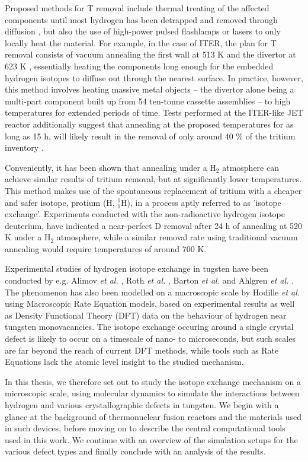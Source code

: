 Proposed methods for T removal include thermal treating of the affected components until most hydrogen has been detrapped and removed through diffusion \cite{heinola2017long}, but also the use of high-power pulsed flashlamps \cite{gibson2005removal} or lasers \cite{skinner2008recent,de2017efficiency} to only locally heat the material. 
For example, in the case of ITER, the plan for T removal consists of vacuum annealing the first wall at 513 K and the divertor at 623 K \cite{pitts2011physics}, essentially heating the components long enough for the embedded hydrogen isotopes to diffuse out through the nearest surface.
In practice, however, this method involves heating massive metal objects -- the divertor alone being a multi-part component built up from 54 ten-tonne cassette assemblies -- to high temperatures for extended periods of time. 
Tests performed at the ITER-like JET reactor additionally suggest that annealing at the proposed temperatures for as long as 15 h, will likely result in the removal of only around 40 \% of the tritium inventory \cite{heinola2017long}. 

Conveniently, it has been shown \cite{alimov2011hydrogen, roth2013hydrogen, barton2014deuterium} that annealing under a H$_2$ atmosphere can achieve similar results of tritium removal, but at significantly lower temperatures. 
This method makes use of the spontaneous replacement of tritium with a cheaper and safer isotope, protium (H, $^1_1$H), in a process aptly referred to as 'isotope exchange'. 
Experiments conducted with the non-radioactive hydrogen isotope deuterium, have indicated a near-perfect D removal after 24 h of annealing at 520 K under a H$_2$ atmosphere, while a similar removal rate using traditional vacuum annealing would require temperatures of around 700 K. \cite{ahlgren2019hydrogen}

Experimental studies of hydrogen isotope exchange in tugsten have been conducted by e.g. Alimov \textit{et al.} \cite{alimov2011hydrogen}, Roth \textit{et al.}  \cite{roth2013hydrogen}, Barton \textit{et al.} \cite{barton2014deuterium} and Ahlgren \textit{et al.} \cite{ahlgren2019hydrogen}. 
The phenomenon has also been modelled on a macroscopic scale by Hodille \textit{et al.} \cite{hodille2016study} using Macroscopic Rate Equation models, based on experimental results as well as Density Functional Theory (DFT) data on the behaviour of hydrogen near tungsten monovacancies. 
The isotope exchange occuring around a single crystal defect is likely to occur on a timescale of nano- to microseconds, but such scales are far beyond the reach of current DFT methods, while tools such as Rate Equations lack the atomic level insight to the studied mechanism.

In this thesis, we therefore set out to study the isotope exchange mechanism on a microscopic scale, using molecular dynamics to simulate the interactions between hydrogen and various crystallographic defects in tungsten.
We begin with a glance at the background of thermonuclear fusion reactors and the materials used in such devices, before moving on to describe the central computational tools used in this work. 
We continue with an overview of the simulation setups for the various defect types and finally conclude with an analysis of the results.

